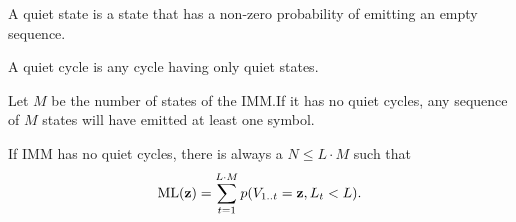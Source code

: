 \begin{definition}
  A quiet state is a state that has a non-zero probability of emitting an empty sequence.
\end{definition}

\begin{definition}
  A quiet cycle is any cycle having only quiet states.
\end{definition}

\begin{corollary}
  Let $M$ be the number of states of the IMM.\@ If it has no quiet cycles, any sequence of $M$ states
  will have emitted at least one symbol.
\end{corollary}

If IMM has no quiet cycles, there is always a $N \leq L\cdot M$ such that
\begin{equation*}
  \mathrm{ML}(\mathbf{z}) = \sum_{t=1}^{L\cdot M} p(V_{1..t}=\mathbf{z}, L_t<L).
\end{equation*}
